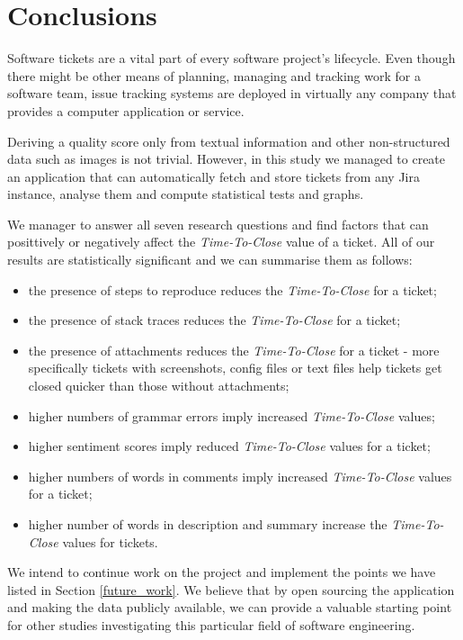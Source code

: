 \documentclass{mpaper}
\begin{document}
\section{Conclusions}\label{conclusions}

Software tickets are a vital part of every software project's lifecycle. Even though there might be other means
of planning, managing and tracking work for a software team, issue tracking systems are deployed in virtually any company
that provides a computer application or service.

Deriving a quality score only from textual information and other non-structured data such as images is not trivial. 
However, in this study we managed to create an application that can automatically fetch and store tickets from any 
Jira instance, analyse them and compute statistical tests and graphs.

We manager to answer all seven research questions and find factors that can posittively or 
negatively affect the \emph{Time-To-Close} value of a ticket. All of our results are statistically significant and we can summarise 
them as follows:
\begin{itemize}
  \item the presence of steps to reproduce reduces the \emph{Time-To-Close} for a ticket;
  \item the presence of stack traces reduces the \emph{Time-To-Close} for a ticket;
  \item the presence of attachments reduces the \emph{Time-To-Close} for a ticket - more specifically tickets with screenshots, 
  config files or text files help tickets get closed quicker than those without attachments;
  \item higher numbers of grammar errors imply increased \emph{Time-To-Close} values;
  \item higher sentiment scores imply reduced \emph{Time-To-Close} values for a ticket;
  \item higher numbers of words in comments imply increased \emph{Time-To-Close} values for a ticket;
  \item higher number of words in description and summary increase the \emph{Time-To-Close} values for tickets.
\end{itemize}

We intend to continue work on the project and implement the points we have listed in Section \ref{future_work}. We believe
that by open sourcing the application and making the data publicly available, we can provide a valuable starting point 
for other studies investigating this particular field of software engineering.
\end{document}
